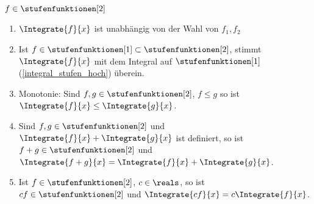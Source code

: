 \begin{satz}\label{r2_eigenschaften}
  \( f\in \stufenfunktionen[2] \)
  \begin{enumerate}
    \item \label{integral_r2_unabhaengig_von_r1_wahl} \( \Integrate{f}{x} \) ist unabhängig von der Wahl von \( f_1,f_2 \)
    \item \label{integral_r2_stimmt_mit_integral_r1_ueberein} Ist \( f\in \stufenfunktionen[1]\subset \stufenfunktionen[2] \), stimmt \( \Integrate{f}{x} \) mit dem Integral auf \( \stufenfunktionen[1]\) (\ref{integral_stufen_hoch}) überein.
    \item \label{integral_r2_monotonie} Monotonie: Sind \( f,g\in \stufenfunktionen[2] \), \( f\leq g \) so ist \( \Integrate{f}{x}\leq \Integrate{g}{x} \).
    \item \label{summe_r2} Sind \( f,g\in \stufenfunktionen[2] \) und \( \Integrate{f}{x}+\Integrate{g}{x} \) ist definiert, so ist \( f+g\in \stufenfunktionen[2] \) und \( \Integrate{f+g}{x}=\Integrate{f}{x}+\Integrate{g}{x} \).
    \item \label{skalarmultiplikation_r2} Ist \( f\in \stufenfunktionen[2] \), \( c\in \reals \), so ist \( cf\in \stufenfunktionen[2] \) und \( \Integrate{cf}{x}=c\Integrate{f}{x} \).
  \end{enumerate}
\end{satz}

